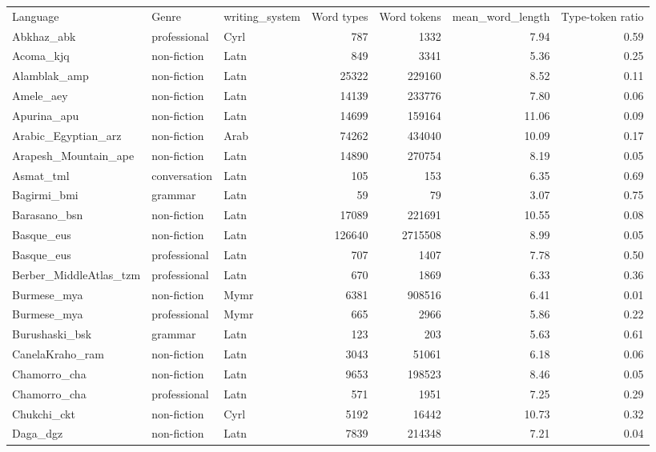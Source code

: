 \begin{longtable}{lllrrrr}
  \hline
Language & Genre & writing\_system & Word types & Word tokens & mean\_word\_length & Type-token ratio \\ 
 Abkhaz\_abk & professional & Cyrl & 787 & 1332 & 7.94 & 0.59 \\ 
  Acoma\_kjq & non-fiction & Latn & 849 & 3341 & 5.36 & 0.25 \\ 
  Alamblak\_amp & non-fiction & Latn & 25322 & 229160 & 8.52 & 0.11 \\ 
  Amele\_aey & non-fiction & Latn & 14139 & 233776 & 7.80 & 0.06 \\ 
  Apurina\_apu & non-fiction & Latn & 14699 & 159164 & 11.06 & 0.09 \\ 
  Arabic\_Egyptian\_arz & non-fiction & Arab & 74262 & 434040 & 10.09 & 0.17 \\ 
  Arapesh\_Mountain\_ape & non-fiction & Latn & 14890 & 270754 & 8.19 & 0.05 \\ 
  Asmat\_tml & conversation & Latn & 105 & 153 & 6.35 & 0.69 \\ 
  Bagirmi\_bmi & grammar & Latn & 59 & 79 & 3.07 & 0.75 \\ 
  Barasano\_bsn & non-fiction & Latn & 17089 & 221691 & 10.55 & 0.08 \\ 
  Basque\_eus & non-fiction & Latn & 126640 & 2715508 & 8.99 & 0.05 \\ 
  Basque\_eus & professional & Latn & 707 & 1407 & 7.78 & 0.50 \\ 
  Berber\_MiddleAtlas\_tzm & professional & Latn & 670 & 1869 & 6.33 & 0.36 \\ 
  Burmese\_mya & non-fiction & Mymr & 6381 & 908516 & 6.41 & 0.01 \\ 
  Burmese\_mya & professional & Mymr & 665 & 2966 & 5.86 & 0.22 \\ 
  Burushaski\_bsk & grammar & Latn & 123 & 203 & 5.63 & 0.61 \\ 
  CanelaKraho\_ram & non-fiction & Latn & 3043 & 51061 & 6.18 & 0.06 \\ 
  Chamorro\_cha & non-fiction & Latn & 9653 & 198523 & 8.46 & 0.05 \\ 
  Chamorro\_cha & professional & Latn & 571 & 1951 & 7.25 & 0.29 \\ 
  Chukchi\_ckt & non-fiction & Cyrl & 5192 & 16442 & 10.73 & 0.32 \\ 
  Daga\_dgz & non-fiction & Latn & 7839 & 214348 & 7.21 & 0.04 \\ 

\end{longtable}
